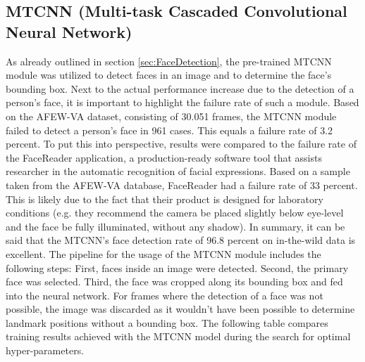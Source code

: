\subsection{MTCNN (Multi-task Cascaded Convolutional Neural Network)}
As already outlined in section \ref{sec:FaceDetection}, the pre-trained MTCNN module was utilized to detect faces in an image and to determine the face's bounding box. 
\newline\newline
Next to the actual performance increase due to the detection of a person's face, it is important to highlight the failure rate of such a module. Based on the AFEW-VA dataset, consisting of 30.051 frames, the MTCNN module failed to detect a person's face in 961 cases. This equals a failure rate of 3.2 percent. 
\newline\newline
To put this into perspective, results were compared to the failure rate of the FaceReader \citep{Noldus:2020:Facereader} application, a production-ready software tool that assists researcher in the automatic recognition of facial expressions. Based on a sample taken from the AFEW-VA database, FaceReader had a failure rate of 33 percent. This is likely due to the fact that their product is designed for laboratory conditions (e.g. they recommend the camera be placed slightly below eye-level and the face be fully illuminated, without any shadow). In summary, it can be said that the MTCNN's face detection rate of 96.8 percent on in-the-wild data is excellent.
\newline\newline
The pipeline for the usage of the MTCNN module includes the following steps: First, faces inside an image were detected. Second, the primary face was selected. Third, the face was cropped along its bounding box and fed into the neural network. For frames where the detection of a face was not possible, the image was discarded as it wouldn't have been possible to determine landmark positions without a bounding box. 
\newline\newline
The following table compares training results achieved with the MTCNN model during the search for optimal hyper-parameters.

